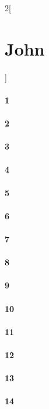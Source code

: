 \documentclass{book}
\begin{document}
\begin{multicols}{2}[\part{John}]
\subsection*{1}
\subsection*{2}
\subsection*{3}
\subsection*{4}
\subsection*{5}
\subsection*{6}
\subsection*{7}
\subsection*{8}
\subsection*{9}
\subsection*{10}
\subsection*{11}
\subsection*{12}
\subsection*{13}
\subsection*{14}

\end{multicols}
\end{document}

